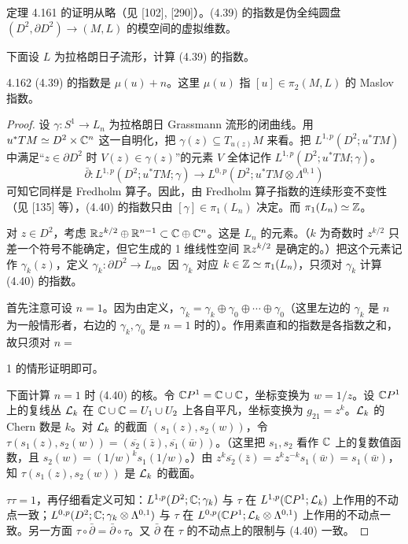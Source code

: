 定理 4.161 的证明从略（见 [102], [290]）。(4.39) 的指数是伪全纯圆盘 $(D^2,\partial D^2)\to(M,L)$ 的模空间的虚拟维数。

下面设 $L$ 为拉格朗日子流形，计算 (4.39) 的指数。

\begin{theorem*}{4.162}
  (4.39) 的指数是 $\mu(u)+n$。这里 $\mu(u)$ 指 $[u]\in\pi_2(M,L)$ 的 Maslov 指数。
\end{theorem*}

\begin{proof}
  设 $\gamma\colon S^1\to L_n$ 为拉格朗日 Grassmann 流形的闭曲线。用 $u^*TM\simeq D^2\times\mathbb{C}^n$ 这一自明化，把 $\gamma(z)\subseteq T_{u(z)}M$ 来看。把 $L^{1,p}(D^2;u^*TM)$ 中满足“$z\in\partial D^2$ 时 $V(z)\in\gamma(z)$”的元素 $V$ 全体记作 $L^{1,p}(D^2;u^*TM;\gamma)$。
  \begin{equation}
    \bar\partial\colon L^{1,p}(D^2;u^*TM;\gamma)\longrightarrow L^{0,p}(D^2;u^*TM\otimes\Lambda^{0,1}) \tag{4.40}
  \end{equation}
  可知它同样是 Fredholm 算子。因此，由 Fredholm 算子指数的连续形变不变性（见 [135] 等），(4.40) 的指数只由 $[\gamma]\in\pi_1(L_n)$ 决定。而 $\pi_1(L_n)\simeq\mathbb{Z}$。

  对 $z\in D^2$，考虑 $\mathbb{R} z^{k/2}\oplus\mathbb{R}^{n-1}\subset\mathbb{C}\oplus\mathbb{C}^n$。这是 $L_n$ 的元素。（$k$ 为奇数时 $z^{k/2}$ 只差一个符号不能确定，但它生成的 1 维线性空间 $\mathbb{R} z^{k/2}$ 是确定的。）把这个元素记作 $\gamma_k(z)$，定义 $\gamma_k\colon\partial D^2\to L_n$。因 $\gamma_k$ 对应 $k\in\mathbb{Z}\simeq\pi_1(L_n)$，只须对 $\gamma_k$ 计算 (4.40) 的指数。

  首先注意可设 $n=1$。因为由定义，$\gamma_k=\gamma_k\oplus\gamma_0\oplus\cdots\oplus\gamma_0$（这里左边的 $\gamma_k$ 是 $n$ 为一般情形者，右边的 $\gamma_k,\gamma_0$ 是 $n=1$ 时的）。作用素直和的指数是各指数之和，故只须对 $n=$

  1 的情形证明即可。

  下面计算 $n=1$ 时 (4.40) 的核。令 $\mathbb{C}P^1=\mathbb{C}\cup\mathbb{C}$，坐标变换为 $w=1/z$。设 $\mathbb{C}P^1$ 上的复线丛 $\mathcal{L}_k$ 在 $\mathbb{C}\cup\mathbb{C}=U_1\cup U_2$ 上各自平凡，坐标变换为 $g_{21}=z^k$。$\mathcal{L}_k$ 的 Chern 数是 $k$。对 $\mathcal{L}_k$ 的截面 $(s_1(z),s_2(w))$，令 $\tau(s_1(z),s_2(w))=(\overline{s_2}(\bar z),\overline{s_1}(\bar w))$。（这里把 $s_1,s_2$ 看作 $\mathbb{C}$ 上的复数值函数，且 $s_2(w)=(1/w)^ks_1(1/w)$。）由 $z^k\overline{s_2}(\bar z)=z^kz^{-k}s_1(\bar w)=s_1(\bar w)$，知 $\tau(s_1(z),s_2(w))$ 是 $\mathcal{L}_k$ 的截面。

  $\tau\tau=1$，再仔细看定义可知：$L^{1,p}(D^2;\mathbb{C};\gamma_k)$ 与 $\tau$ 在 $L^{1,p}(\mathbb{C}P^1;\mathcal{L}_k)$ 上作用的不动点一致；$L^{0,p}(D^2;\mathbb{C};\gamma_k\otimes\Lambda^{0,1})$ 与 $\tau$ 在 $L^{0,p}(\mathbb{C}P^1;\mathcal{L}_k\otimes\Lambda^{0,1})$ 上作用的不动点一致。另一方面 $\tau\circ\bar\partial=\bar\partial\circ\tau$。又 $\bar\partial$ 在 $\tau$ 的不动点上的限制与 (4.40) 一致。


\end{proof}
